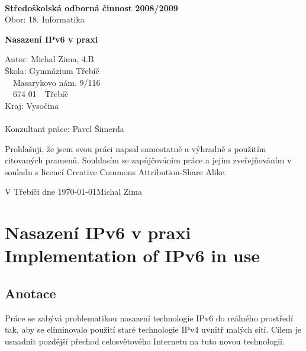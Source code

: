 \documentclass[12pt]{report}
\begin{document}
\thispagestyle{empty}
\begin{titlepage}
\begin{center}

\ \\

{\Large\bf Středoškolská odborná činnost 2008/2009}\\
{\Large Obor: 18. Informatika}

\vspace{35mm}

{\Huge\bf Nasazení IPv6 v praxi}\\

\end{center}

\vspace{\fill}

{\large
\noindent Autor: Michal Zima, 4.B\\
\noindent Škola: Gymnázium Třebíč\\
\indent\indent ~~Masarykovo nám. 9/116\\
\indent\indent ~~674 01~~Třebíč\\
\noindent Kraj: Vysočina\\
\\
\noindent Konzultant práce: Pavel Šimerda\\
}

\end{titlepage}
\setcounter{page}{2}  %

\thispagestyle{empty}
Prohlašuji, že jsem svou práci napsal samostatně a výhradně s použitím citovaných pramenů. Souhlasím se zapůjčováním práce a jejím zveřejňováním v souladu s licencí Creative Commons Attribution-Share Alike.

\bigskip	%
\noindent V Třebíči dne \today \hspace{\fill}Michal Zima
\newpage{}


\thispagestyle{plain}
\section*{Nasazení IPv6 v praxi\\Implementation of IPv6 in use}

\subsection*{Anotace}
Práce se zabývá problematikou nasazení technologie IPv6 do reálného prostředí tak, aby se eliminovalo použití staré technologie IPv4 uvnitř malých sítí. Cílem je usnadnit pozdější přechod celosvětového Internetu na tuto novou technologii.
\end{document}
